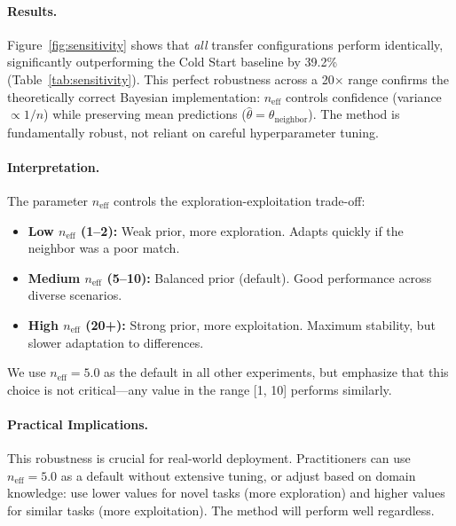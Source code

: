 \paragraph{Results.}
Figure~\ref{fig:sensitivity} shows that \emph{all} transfer configurations 
perform identically, significantly outperforming the Cold Start baseline by 39.2\% 
(Table~\ref{tab:sensitivity}). This perfect robustness across a 20$\times$ range 
confirms the theoretically correct Bayesian implementation: $n_{\text{eff}}$ 
controls confidence (variance $\propto 1/n$) while preserving mean predictions 
($\hat{\theta} = \theta_{\text{neighbor}}$). The method is fundamentally robust, 
not reliant on careful hyperparameter tuning.

\paragraph{Interpretation.}
The parameter $n_{\text{eff}}$ controls the exploration-exploitation trade-off:
\begin{itemize}[leftmargin=*,noitemsep]
    \item \textbf{Low $n_{\text{eff}}$ (1--2):} Weak prior, more exploration. 
    Adapts quickly if the neighbor was a poor match.
    \item \textbf{Medium $n_{\text{eff}}$ (5--10):} Balanced prior (default). 
    Good performance across diverse scenarios.
    \item \textbf{High $n_{\text{eff}}$ (20+):} Strong prior, more exploitation. 
    Maximum stability, but slower adaptation to differences.
\end{itemize}
We use $n_{\text{eff}}=5.0$ as the default in all other experiments, but emphasize 
that this choice is not critical---any value in the range [1, 10] performs similarly.

\paragraph{Practical Implications.}
This robustness is crucial for real-world deployment. Practitioners can use 
$n_{\text{eff}}=5.0$ as a default without extensive tuning, or adjust based on 
domain knowledge: use lower values for novel tasks (more exploration) and higher 
values for similar tasks (more exploitation). The method will perform well regardless.

